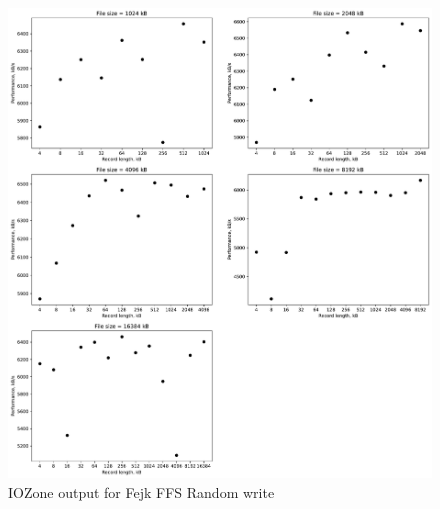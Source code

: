 \begin{figure}[!htb]
	\label{fig:app_bench_ffsf_rnd_write}
	\begin{center}
		\includegraphics[width=1.0\textwidth]{figures/benchmarking/fake-ffs/Random write.pdf}
	\end{center}
	\caption{IOZone output for Fejk FFS Random write}
\end{figure}

